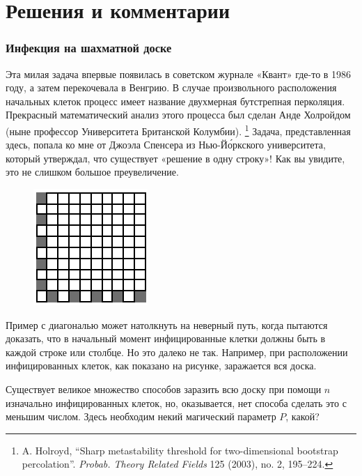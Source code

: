 \section*{Решения и комментарии}

\subsubsection*{Инфекция на шахматной доске}%

{\sloppy

Эта милая задача впервые появилась в советском журнале «Квант» %
где-то в 1986 году, а затем перекочевала в Венгрию.
В случае произвольного расположения начальных клеток процесс имеет название двухмерная бутстрепная перколяция.
Прекрасный математический анализ этого процесса был сделан Анде Холройдом (ныне профессор Университета Британской Колумбии).%
\footnote{A. Holroyd, ``Sharp metastability threshold for two-dimensional bootstrap percolation''. \emph{Probab. Theory Related Fields} 125 (2003), no. 2, 195--224.}
Задача, представленная здесь, попала ко мне от Джоэла Спенсера %
из Нью-Й\'{о}ркского университета, который утверждал, что существует «решение в одну строку»!
Как вы увидите, это не слишком большое преувеличение.

}

\begin{figure}
\vskip-3mm
\centering
\includegraphics[scale=1.5]{Figs/Algorithms/sick}
\end{figure}

\medskip

Пример с диагональю может натолкнуть на неверный путь, когда пытаются доказать, что в начальный момент инфицированные клетки должны быть в каждой строке или столбце.
Но это далеко не так.
Например, при расположении инфицированных клеток, как показано на рисунке, заражается вся доска.


Существует великое множество способов заразить всю доску при помощи $n$ изначально инфицированных клеток, но, оказывается, нет способа сделать это с меньшим числом.
Здесь необходим некий магический параметр $P$, какой?

